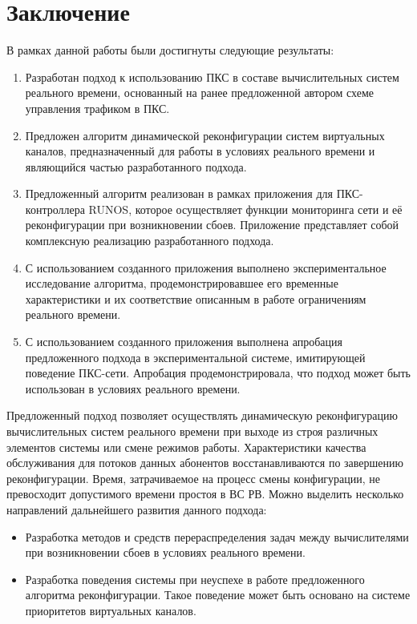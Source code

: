 \documentclass[12pt, a4paper]{article}
\begin{document}
\section*{Заключение}

В рамках данной работы были достигнуты следующие результаты:
\begin{enumerate}
	\item Разработан подход к использованию ПКС в составе вычислительных систем реального времени, основанный на ранее предложенной автором схеме управления трафиком в ПКС.
	\item Предложен алгоритм динамической реконфигурации систем виртуальных каналов, предназначенный для работы в условиях реального времени и являющийся частью разработанного подхода.
	\item Предложенный алгоритм реализован в рамках приложения для ПКС-контроллера RUNOS, которое осуществляет функции мониторинга сети и её реконфигурации при возникновении сбоев. Приложение представляет собой комплексную реализацию разработанного подхода.
	\item С использованием созданного приложения выполнено экспериментальное исследование алгоритма, продемонстрировавшее его временные характеристики и их соответствие описанным в работе ограничениям реального времени.
	\item С использованием созданного приложения выполнена апробация предложенного подхода в экспериментальной системе, имитирующей поведение ПКС-сети. Апробация продемонстрировала, что подход может быть использован в условиях реального времени.
\end{enumerate}

Предложенный подход позволяет осуществлять динамическую реконфигурацию вычислительных систем реального времени при выходе из строя различных элементов системы или смене режимов работы. Характеристики качества обслуживания для потоков данных абонентов восстанавливаются по завершению реконфигурации. Время, затрачиваемое на процесс смены конфигурации, не превосходит допустимого времени простоя в ВС РВ. Можно выделить несколько направлений дальнейшего развития данного подхода:
\begin{itemize}
	\item Разработка методов и средств перераспределения задач между вычислителями при возникновении сбоев в условиях реального времени.
	\item  Разработка поведения системы при неуспехе в работе предложенного алгоритма реконфигурации. Такое поведение может быть основано на системе приоритетов виртуальных каналов.
\end{itemize}
\end{document}
